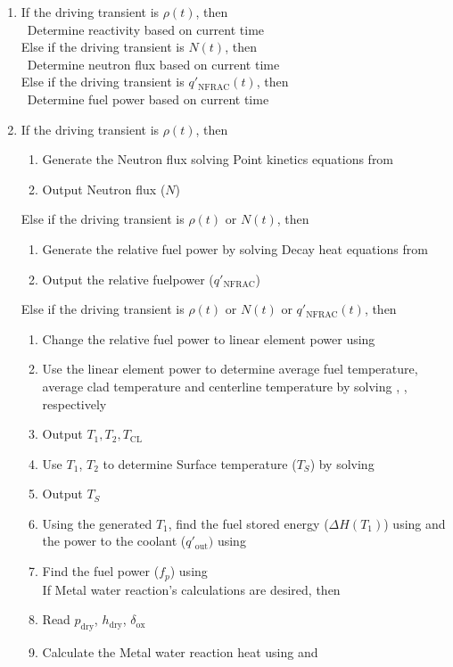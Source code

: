 \begin{enumerate}
\item If the driving transient is $\rho(t)$, then
  \\
  \indent \ Determine reactivity based on current time\\
  \indent Else if the driving transient is $N(t)$, then\\
  \indent \ Determine neutron flux based on current time\\
  \indent Else if the driving transient is $q'_{\text{NFRAC}}(t)$, then\\
  \indent \ Determine fuel power based on current time
\item
  If the driving transient is $\rho(t)$, then
  \begin{enumerate}
  \item Generate the Neutron flux solving Point kinetics equations from
  \item Output Neutron flux ($N$)
  \end{enumerate}

\indent Else if the driving transient is $\rho(t)$ or $N(t)$, then

\begin{enumerate} 
\item Generate the relative fuel power by solving Decay heat equations from
\item Output the relative fuelpower ($q'_{\text{NFRAC}}$)
\end{enumerate}

\indent Else if the driving transient is $\rho(t)$ or $N(t)$ or
$q'_{\text{NFRAC}}(t)$, then

\begin{enumerate}
\item Change the relative fuel power to linear element power using
   \label{s2}
\item Use the linear element power to determine average fuel temperature,
  average clad temperature and centerline temperature by solving ,
   , respectively
\item Output  $T_1,T_2,T_{\text{CL}}$
\item Use $T_1$, $T_2$ to determine Surface temperature ($T_S$) by solving
\item Output  $T_S$
\item Using the generated $T_1$, find the fuel stored energy ($\Delta H(T_1)$)
  using  and the power to the coolant
  ($q'_{\text{out}})$ using 
\item Find the fuel power ($f_p$) using \\
  \indent If Metal water reaction's calculations are desired, then
\item  Read $p_{\text{dry}}$, $h_{\text{dry}}$, $\delta_{\text{ox}}$
\item Calculate the Metal water reaction heat using  and
\end{enumerate}
\end{enumerate}

